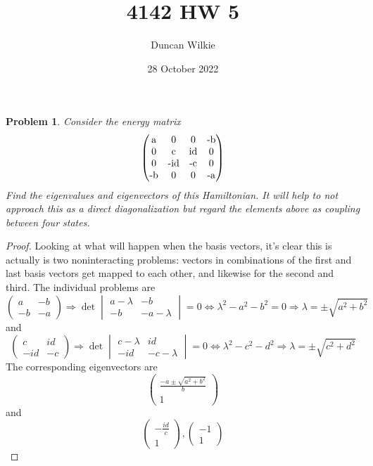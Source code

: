 \documentclass{article}
\title{4142 HW 5}
\author{Duncan Wilkie}
\date{28 October 2022}
\newtheorem{plm}{Problem}
\begin{document}
\maketitle

\begin{plm}
  Consider the energy matrix
  \[
    \begin{pmatrix}
      $a$ & 0 & 0 & $-b$ \\
      0 & $c$ & $id$ & 0 \\
      0 & $-id$ & $-c$ & 0 \\
      $-b$ & 0 & 0 &  $-a$
    \end{pmatrix}
  \]
  Find the eigenvalues and eigenvectors of this Hamiltonian.
  It will help to not approach this as a direct diagonalization but regard the elements above as coupling between four states.
\end{plm}

\begin{proof}
  Looking at what will happen when the basis vectors, it's clear this is actually is two noninteracting problems:
  vectors in combinations of the first and last basis vectors get mapped to each other, and likewise for the second and third.
  The individual problems are
  \[
    \begin{pmatrix}
      a & -b \\
      -b & -a
    \end{pmatrix}
    \Rightarrow \det
    \begin{vmatrix}
      a - \lambda & -b \\
      -b & -a - \lambda
    \end{vmatrix} = 0
    \Leftrightarrow \lambda^{2} - a^{2} - b^{2} = 0 \Rightarrow \lambda = \pm \sqrt{a^{2} + b^{2}}
  \]
  and
  \[
    \begin{pmatrix}
      c & id \\
      -id & -c
    \end{pmatrix}
    \Rightarrow \det
    \begin{vmatrix}
      c - \lambda & id \\
      -id & -c - \lambda
    \end{vmatrix}
    = 0
    \Leftrightarrow \lambda^{2} - c^{2} - d^{2} \Rightarrow \lambda = \pm \sqrt{c^{2} + d^{2}}
  \]
  The corresponding eigenvectors are
  \[
    \begin{pmatrix}
      \frac{-a \pm \sqrt{a^{2} + b^{2}}}{b} \\
      1
    \end{pmatrix}
  \]
  and
  \[
    \begin{pmatrix}
      -\frac{id}{c} \\
      1
    \end{pmatrix},
    \begin{pmatrix}
      -1 \\
      1
    \end{pmatrix}

  \]
\end{proof}
\end{document}
